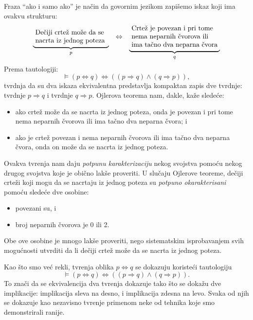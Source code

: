 Fraza \enquote{ako i samo ako} je na\v cin da govornim jezikom zapi\v semo iskaz koji ima ovakvu strukturu:
$$
\begin{array}{ccc}
  \underbrace{\hbox{
    \begin{tabular}{@{}p{1.45in}@{}}
      De\v ciji crte\v z mo\v ze da se\\nacrta iz jednog poteza
    \end{tabular}
  }}_p
  &
  \Leftrightarrow
  &
  \underbrace{\hbox{
    \begin{tabular}{@{}p{1.75in}@{}}
      Crte\v z je povezan i pri tome\\
      nema neparnih \v cvorova ili\\
      ima ta\v cno dva neparna \v cvora
    \end{tabular}
  }}_q
\end{array}
$$
Prema tautologiji:
$$
  \vDash (p \Leftrightarrow q) \Leftrightarrow ((p \Rightarrow q) \land (q \Rightarrow p)),
$$
tvrdnja da su dva iskaza ekvivalentna predstavlja kompaktan zapis dve tvrdnje: tvrdnje $p \Rightarrow q$ i tvrdnje $q \Rightarrow p$.
Ojlerova teorema nam, dakle, ka\v ze slede\'ce:
\begin{itemize}
  \item ako crte\v z mo\v ze da se nacrta iz jednog poteza, onda je povezan i pri tome nema neparnih \v cvorova ili ima ta\v cno dva neparna \v cvora; i
  \item ako je crte\v z povezan i nema neparnih \v cvorova ili ima ta\v cno dva neparna \v cvora, onda on mo\v ze da se nacrta iz jednog poteza.
\end{itemize}
Ovakva tvr\dj enja nam daju \emph{potpunu karakterizaciju} nekog svojstva pomo\'cu nekog drugog svojstva koje je obi\v cno lak\v se proveriti.
U slu\v caju Ojlerove teoreme, de\v ciji crte\v zi koji mogu da se nacrtaju iz jednog poteza su \emph{potpuno okarakterisani} pomo\'cu slede\'ce
dve osobine:
\begin{itemize}
  \item povezani su, i
  \item broj neparnih \v cvorova je 0 ili 2.
\end{itemize}
Obe ove osobine je mnogo lak\v se proveriti, nego sistematskim isprobavanjem svih mogu\'cnosti
utvrditi da li de\v ciji crte\v z mo\v ze da se nacrta iz jednog poteza.


\bigskip


Kao \v sto smo ve\'c rekli, tvr\dj enja oblika
$
  p \Leftrightarrow q
$
se dokazuju koriste\'ci tautologiju
$$
  \vDash (p \Leftrightarrow q) \Leftrightarrow ((p \Rightarrow q) \land (q \Rightarrow p)).
$$
To zna\v ci da se ekvivalencija dva tvr\dj enja dokazuje tako \v sto se doka\v zu dve implikacije: implikacija
sleva na desno, i implikacija zdesna na levo. Svaka od njih se dokazuje kao nezavisno tvr\dj enje primenom
neke od tehnika koje smo demonstrirali ranije.

